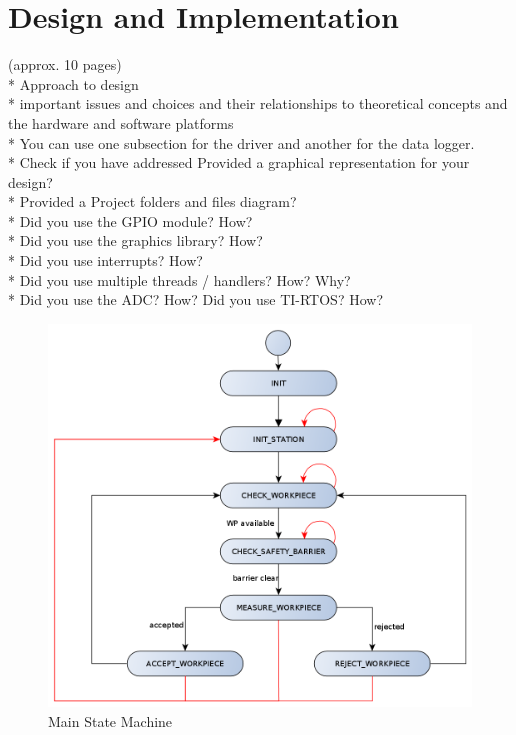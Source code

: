 \chapter{Design and Implementation}

(approx. 10 pages)\\
* Approach to design\\
* important issues and choices and their relationships to theoretical concepts and the hardware and software platforms\\
* You can use one subsection for the driver and another for the data logger.\\

* Check if you have addressed Provided a graphical representation for your design?\\
* Provided a Project folders and files diagram?\\
* Did you use the GPIO module? How?\\
* Did you use the graphics library? How?\\
* Did you use interrupts? How?\\
* Did you use multiple threads / handlers? How? Why?\\
* Did you use the ADC? How? Did you use TI-RTOS? How?



\begin{figure}[H]
	\begin{center}
		\includegraphics[scale=.50]{media/StateMachine_Main.png} 	
		\caption{Main State Machine}
		\label{fig:statemachine}
	\end{center}
\end{figure}



